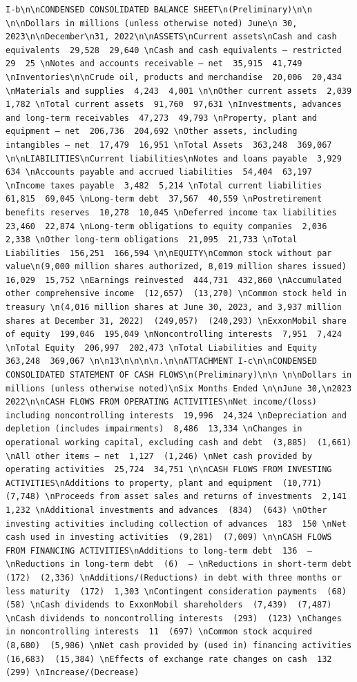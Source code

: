 \documentclass[
  letterpaper,
  DIV=11,
  numbers=noendperiod]{scrreprt}
\begin{document}
\begin{verbatim}
I-b\n\nCONDENSED CONSOLIDATED BALANCE SHEET\n(Preliminary)\n\n \n\nDollars in millions (unless otherwise noted) June\n 30, 2023\n\nDecember\n31, 2022\n\nASSETS\nCurrent assets\nCash and cash equivalents  29,528  29,640 \nCash and cash equivalents – restricted  29  25 \nNotes and accounts receivable – net  35,915  41,749 \nInventories\n\nCrude oil, products and merchandise  20,006  20,434 \nMaterials and supplies  4,243  4,001 \n\nOther current assets  2,039  1,782 \nTotal current assets  91,760  97,631 \nInvestments, advances and long-term receivables  47,273  49,793 \nProperty, plant and equipment – net  206,736  204,692 \nOther assets, including intangibles – net  17,479  16,951 \nTotal Assets  363,248  369,067 \n\nLIABILITIES\nCurrent liabilities\nNotes and loans payable  3,929  634 \nAccounts payable and accrued liabilities  54,404  63,197 \nIncome taxes payable  3,482  5,214 \nTotal current liabilities  61,815  69,045 \nLong-term debt  37,567  40,559 \nPostretirement benefits reserves  10,278  10,045 \nDeferred income tax liabilities  23,460  22,874 \nLong-term obligations to equity companies  2,036  2,338 \nOther long-term obligations  21,095  21,733 \nTotal Liabilities  156,251  166,594 \n\nEQUITY\nCommon stock without par value\n(9,000 million shares authorized, 8,019 million shares issued)  16,029  15,752 \nEarnings reinvested  444,731  432,860 \nAccumulated other comprehensive income  (12,657)  (13,270) \nCommon stock held in treasury \n(4,016 million shares at June 30, 2023, and 3,937 million shares at December 31, 2022)  (249,057)  (240,293) \nExxonMobil share of equity  199,046  195,049 \nNoncontrolling interests  7,951  7,424 \nTotal Equity  206,997  202,473 \nTotal Liabilities and Equity  363,248  369,067 \n\n13\n\n\n\n.\n\nATTACHMENT I-c\n\nCONDENSED CONSOLIDATED STATEMENT OF CASH FLOWS\n(Preliminary)\n\n \n\nDollars in millions (unless otherwise noted)\nSix Months Ended \n\nJune 30,\n2023 2022\n\nCASH FLOWS FROM OPERATING ACTIVITIES\nNet income/(loss) including noncontrolling interests  19,996  24,324 \nDepreciation and depletion (includes impairments)  8,486  13,334 \nChanges in operational working capital, excluding cash and debt  (3,885)  (1,661) \nAll other items – net  1,127  (1,246) \nNet cash provided by operating activities  25,724  34,751 \n\nCASH FLOWS FROM INVESTING ACTIVITIES\nAdditions to property, plant and equipment  (10,771)  (7,748) \nProceeds from asset sales and returns of investments  2,141  1,232 \nAdditional investments and advances  (834)  (643) \nOther investing activities including collection of advances  183  150 \nNet cash used in investing activities  (9,281)  (7,009) \n\nCASH FLOWS FROM FINANCING ACTIVITIES\nAdditions to long-term debt  136  — \nReductions in long-term debt  (6)  — \nReductions in short-term debt  (172)  (2,336) \nAdditions/(Reductions) in debt with three months or less maturity  (172)  1,303 \nContingent consideration payments  (68)  (58) \nCash dividends to ExxonMobil shareholders  (7,439)  (7,487) \nCash dividends to noncontrolling interests  (293)  (123) \nChanges in noncontrolling interests  11  (697) \nCommon stock acquired  (8,680)  (5,986) \nNet cash provided by (used in) financing activities  (16,683)  (15,384) \nEffects of exchange rate changes on cash  132  (299) \nIncrease/(Decrease) 
\end{verbatim}
\end{document}
